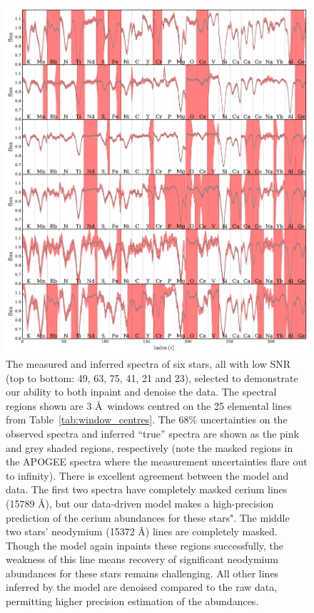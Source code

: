 \documentclass[a4paper,fleqn,usenatbib]{mnras}
\begin{document}
\begin{figure}
	\includegraphics[width=2\columnwidth]{apogee_centers_final_29502_spc_iw_prior_win_wid_1p5_save_spectra.pdf}
    \caption{The measured and inferred spectra of six stars, all with low SNR (top to bottom: 49, 63, 75, 41, 21 and 23), selected to demonstrate our ability to both inpaint and denoise the data. The spectral regions shown are 3 \AA\ windows centred on the 25 elemental lines from Table~\ref{tab:window_centres}. The 68\% uncertainties on the observed spectra and inferred ``true'' spectra are shown as the pink and grey shaded regions, respectively (note the masked regions in the APOGEE spectra where the measurement uncertainties flare out to infinity). There is excellent agreement between the model and data. The first two spectra have completely masked cerium lines (15789 \AA), but our data-driven model makes a high-precision prediction of the cerium abundances for these stars". The middle two stars' neodymium (15372 \AA) lines are completely masked. Though the model again inpaints these regions successfully, the weakness of this line means recovery of significant neodymium abundances for these stars remains challenging. All other lines inferred by the model are denoised compared to the raw data, permitting higher precision  estimation of the  abundances.}
    \label{fig:inpainting_denoising_examples}
\end{figure}
\end{document}
